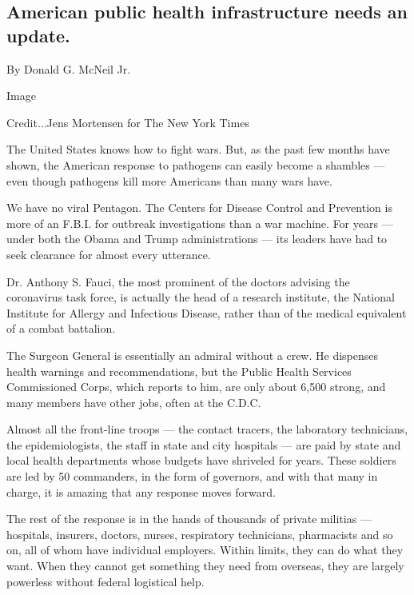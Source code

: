 \hypertarget{american-public-health-infrastructure-needs-an-update}{%
\subsection{American public health infrastructure needs an
update.}\label{american-public-health-infrastructure-needs-an-update}}

By Donald G. McNeil Jr.

Image

Credit...Jens Mortensen for The New York Times

The United States knows how to fight wars. But, as the past few months
have shown, the American response to pathogens can easily become a
shambles --- even though pathogens kill more Americans than many wars
have.

We have no viral Pentagon. The Centers for Disease Control and
Prevention is more of an F.B.I. for outbreak investigations than a war
machine. For years --- under both the Obama and Trump administrations
--- its leaders have had to seek clearance for almost every utterance.

Dr. Anthony S. Fauci, the most prominent of the doctors advising the
coronavirus task force, is actually the head of a research institute,
the National Institute for Allergy and Infectious Disease, rather than
of the medical equivalent of a combat battalion.

The Surgeon General is essentially an admiral without a crew. He
dispenses health warnings and recommendations, but the Public Health
Services Commissioned Corps, which reports to him, are only about 6,500
strong, and many members have other jobs, often at the C.D.C.

Almost all the front-line troops --- the contact tracers, the laboratory
technicians, the epidemiologists, the staff in state and city hospitals
--- are paid by state and local health departments whose budgets have
shriveled for years. These soldiers are led by 50 commanders, in the
form of governors, and with that many in charge, it is amazing that any
response moves forward.

The rest of the response is in the hands of thousands of private
militias --- hospitals, insurers, doctors, nurses, respiratory
technicians, pharmacists and so on, all of whom have individual
employers. Within limits, they can do what they want. When they cannot
get something they need from overseas, they are largely powerless
without federal logistical help.

